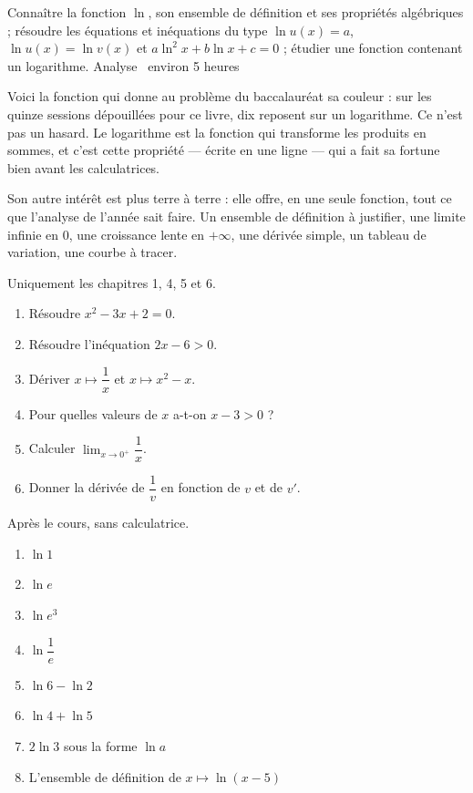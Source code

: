   {Connaître la fonction $\ln$, son ensemble de définition et ses propriétés
   algébriques ; résoudre les équations et inéquations du type
   $\ln u(x) = a$, $\ln u(x) = \ln v(x)$ et
   $a\ln^{2}x+b\ln x+c = 0$ ; étudier une fonction contenant un logarithme.}
  {Analyse \textbullet\ environ 5 heures}

Voici la fonction qui donne au problème du baccalauréat sa couleur : sur les
quinze sessions dépouillées pour ce livre, dix reposent sur un logarithme.
Ce n'est pas un hasard. Le logarithme est la fonction qui transforme les
produits en sommes, et c'est cette propriété — écrite en une ligne — qui a
fait sa fortune bien avant les calculatrices.

Son autre intérêt est plus terre à terre : elle offre, en une seule fonction,
tout ce que l'analyse de l'année sait faire. Un ensemble de définition à
justifier, une limite infinie en $0$, une croissance lente en $+\infty$, une
dérivée simple, un tableau de variation, une courbe à tracer.

\begin{revision}
Uniquement les chapitres 1, 4, 5 et 6.

\begin{enumerate}[label=\textbf{\arabic*.}, leftmargin=*, itemsep=0.35em]
  \item Résoudre $x^{2}-3x+2 = 0$.
  \item Résoudre l'inéquation $2x-6 > 0$.
  \item Dériver $x \mapsto \dfrac{1}{x}$ et $x \mapsto x^{2}-x$.
  \item Pour quelles valeurs de $x$ a-t-on $x-3 > 0$ ?
  \item Calculer $\displaystyle\lim_{x \to 0^{+}} \dfrac{1}{x}$.
  \item Donner la dérivée de $\dfrac1v$ en fonction de $v$ et de $v'$.
\end{enumerate}
\end{revision}

\begin{automatismes}
Après le cours, sans calculatrice.

\begin{enumerate}[label=\textbf{\alph*)}, leftmargin=*, itemsep=0.25em]
  \item $\ln 1$
  \item $\ln e$
  \item $\ln e^{3}$
  \item $\ln \dfrac1e$
  \item $\ln 6-\ln 2$
  \item $\ln 4+\ln 5$
  \item $2\ln 3$ sous la forme $\ln a$
  \item L'ensemble de définition de $x \mapsto \ln(x-5)$
\end{enumerate}
\end{automatismes}

